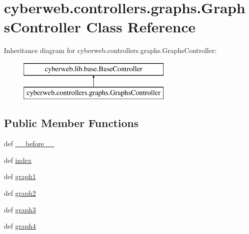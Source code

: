 \hypertarget{classcyberweb_1_1controllers_1_1graphs_1_1_graphs_controller}{\section{cyberweb.\-controllers.\-graphs.\-Graphs\-Controller \-Class \-Reference}
\label{classcyberweb_1_1controllers_1_1graphs_1_1_graphs_controller}
}
\-Inheritance diagram for cyberweb.\-controllers.\-graphs.\-Graphs\-Controller\-:\begin{figure}[H]
\begin{center}
\leavevmode
\includegraphics[height=2.000000cm]{classcyberweb_1_1controllers_1_1graphs_1_1_graphs_controller}
\end{center}
\end{figure}
\subsection*{\-Public \-Member \-Functions}
\begin{DoxyCompactItemize}
\item 
def \hyperlink{classcyberweb_1_1controllers_1_1graphs_1_1_graphs_controller_a8b55357bb3cfb45c0ecb01b766c4b025}{\-\_\-\-\_\-before\-\_\-\-\_\-}
\item 
def \hyperlink{classcyberweb_1_1controllers_1_1graphs_1_1_graphs_controller_a60d6f70513a9156de2c221b9aed5510a}{index}
\item 
def \hyperlink{classcyberweb_1_1controllers_1_1graphs_1_1_graphs_controller_aa9f436709a98711defeaf0f3482023c1}{graph1}
\item 
def \hyperlink{classcyberweb_1_1controllers_1_1graphs_1_1_graphs_controller_a8a941be6c4aa8c36eca919cda3b62c06}{graph2}
\item 
def \hyperlink{classcyberweb_1_1controllers_1_1graphs_1_1_graphs_controller_ae2199395319537c2638a29de6bf3964e}{graph3}
\item 
def \hyperlink{classcyberweb_1_1controllers_1_1graphs_1_1_graphs_controller_a6a23275121ba4f9cacb57aa16b9c32ba}{graph4}
\end{DoxyCompactItemize}


